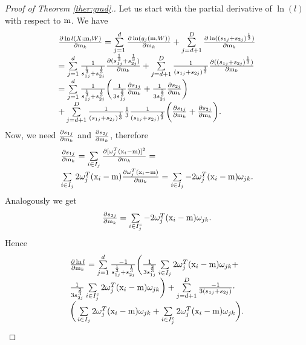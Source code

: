 \begin{proof}[Proof of Theorem \ref{ther:grad}.]
Let us start with the partial derivative of $\ln({l})$ with respect to $\mathrm{m}$. We have
$$
\begin{array}{l}
\frac{\partial \ln {l}(X;\mathrm{m},W)}{\partial \mathrm{m}_k} =
\sum \limits_{j=1}^d \frac{\partial \ln ({g}_j(\mathrm{m},W))}{\partial \mathrm{m}_k} + \sum \limits_{j=d+1}^D \frac{\partial \ln ((s_{1j}+s_{2j})^{\frac{1}{3}})}{\partial \mathrm{m}_k} \\[6pt]
= \sum\limits_{j=1}^d \frac{1}{{s}_{1j}^{\frac{1}{3}} + {s}_{2j}^{\frac{1}{3}}} \frac{\partial ({s}_{1j}^{\frac{1}{3}} + {s}_{2j}^{\frac{1}{3}})}{\partial \mathrm{m}_k} + \sum\limits_{j=d+1}^D \frac{1}{({s}_{1j} + {s}_{2j})^{\frac{1}{3}}} \frac{\partial (({s}_{1j} + {s}_{2j})^{\frac{1}{3}})}{\partial \mathrm{m}_k} \\[6pt]
= \sum \limits_{j=1}^d \frac{1}{{s}_{1j}^{\frac{1}{3}} + {s}_{2j}^{\frac{1}{3}}} \bigg(
\frac{1}{3 {s}_{1j}^{\frac{2}{3}}} \frac{\partial {s}_{1j}}{\partial \mathrm{m}_k} +
\frac{1}{3 {s}_{2j}^{\frac{2}{3}}} \frac{\partial {s}_{2j}}{\partial \mathrm{m}_k}
\bigg) \\[6pt]
+ \sum \limits_{j=d+1}^D \frac{1}{({s}_{1j} + {s}_{2j})^{\frac{1}{3}}} \frac{1}{3} \frac{1}{({s}_{1j} + {s}_{2j})^{\frac{2}{3}}}\bigg(
\frac{\partial {s}_{1j}}{\partial \mathrm{m}_k} +
\frac{\partial {s}_{2j}}{\partial \mathrm{m}_k}
\bigg).
\end{array}
$$
Now, we need $\frac{\partial {s}_{1j}}{\partial \mathrm{m}_k}$ and $\frac{\partial {s}_{2j}}{\partial \mathrm{m}_k}$, therefore
$$
\begin{array}{l}
\frac{\partial {s}_{1j}}{\partial \m_k} = 
\sum\limits_{i \in {I}_j} \frac{\partial [\w^T_j (\x_i - \m)]^2}{\partial \m_k} =\\[6pt]
 \sum\limits_{i \in {I}_j} 2 \w^T_j (\x_i - \m) \frac{\partial \w^T_j (\x_i - \m)}{\partial \m_k} = %
 \sum\limits_{i \in {I}_j} - 2 \w^T_j (\x_i - \m) \w_{jk}.
\end{array}
$$
Analogously we get
$$
\begin{array}{l}
\frac{\partial {s}_{2j}}{\partial \mathrm{m}_k} = \sum\limits_{i \in {I}_j^c} -2 \omega^T_j (\mathrm{x}_i - \mathrm{m}) \omega_{jk}.
\end{array}
$$
Hence 
$$
\begin{array}{l}
\frac{\partial \ln {l}}{\partial \m_k} =\sum\limits_{j=1}^d \frac{-1}{{s}_{1j}^{\frac{1}{3}} + {s}_{2j}^{\frac{1}{3}}} \bigg(
\frac{1}{3 {s}_{1j}^{\frac{2}{3}}} \sum\limits_{i \in I_j} 2 \w_j^T (\x_i - \m)  \w_{jk} + \\[6pt]
\frac{1}{3 {s}_{2j}^{\frac{2}{3}}} \sum\limits_{i \in I_j^c} 2 \w_j^T (\x_i - \m) \w_{jk}
\bigg) + \sum\limits_{j=d+1}^D \frac{-1}{3(s_{1j}+s_{2j})} \cdot \\[6pt]
\bigg(
 \sum\limits_{i \in I_j} 2 \w_j^T (\x_i - \m)  \w_{jk} +%
 \sum\limits_{i \in I_j^c} 2 \w_j^T (\x_i - \m) \w_{jk}
\bigg)
.
\end{array}
$$


\end{proof}
